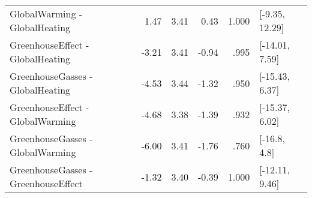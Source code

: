 \begin{table}[ht]
\begin{tabular}{lrrrrl}
  GlobalWarming - GlobalHeating & 1.47 & 3.41 & 0.43 & 1.000 & [-9.35, 12.29] \\ 
  GreenhouseEffect - GlobalHeating & -3.21 & 3.41 & -0.94 & .995 & [-14.01, 7.59] \\ 
  GreenhouseGasses - GlobalHeating & -4.53 & 3.44 & -1.32 & .950 & [-15.43, 6.37] \\ 
  GreenhouseEffect - GlobalWarming & -4.68 & 3.38 & -1.39 & .932 & [-15.37, 6.02] \\ 
  GreenhouseGasses - GlobalWarming & -6.00 & 3.41 & -1.76 & .760 & [-16.8, 4.8] \\ 
  GreenhouseGasses - GreenhouseEffect & -1.32 & 3.40 & -0.39 & 1.000 & [-12.11, 9.46] \\ 
   \hline
\end{tabular}
\end{table}
